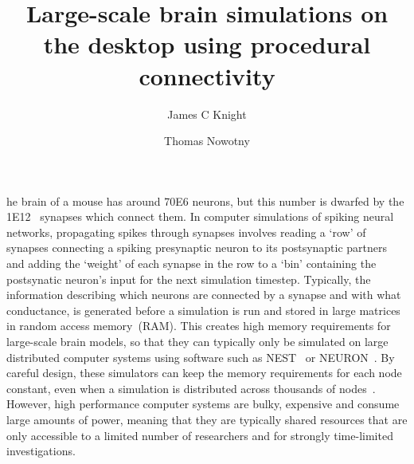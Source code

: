 \documentclass[9pt,twocolumn,twoside,lineno]{pnas-new}
\title{Large-scale brain simulations on the desktop using procedural connectivity}
\author[a,1]{James C Knight}
\author[a]{Thomas Nowotny}
\affil[a]{Centre for Computational Neuroscience and Robotics, School of Engineering and Informatics, University of Sussex, Brighton, United Kingdom}
\newcommand{\todo}[1]{\textbf{\textsc{\textcolor{red}{(TODO: #1)}}}}
\begin{document}
\maketitle
\thispagestyle{firststyle}

he brain of a mouse has around \num{70E6} neurons, but this number is dwarfed by the \num{1E12}~\citep{Herculano-Houzel2010} synapses which connect them.
In computer simulations of spiking neural networks, propagating spikes through synapses involves reading a `row' of synapses connecting a spiking presynaptic neuron to its postsynaptic partners and adding the `weight' of each synapse in the row to a `bin' containing the postsynatic neuron's input for the next simulation timestep.
Typically, the information describing which neurons are connected by a synapse and with what conductance, is generated before a simulation is run and stored in large matrices in random access memory~(RAM). 
This creates high memory requirements for large-scale brain models, so that they can typically only be simulated on large distributed computer systems using software such as NEST~\citep{Gewaltig2007} or NEURON~\citep{carnevale2006neuron}.
By careful design, these simulators can keep the memory requirements for each node constant, even when a simulation is distributed across thousands of nodes~\citep{Jordan2018}.
However, high performance computer systems are bulky, expensive and consume large amounts of power, meaning that they are typically shared resources that are only accessible to a limited number of researchers and for strongly time-limited investigations.
\end{document}
